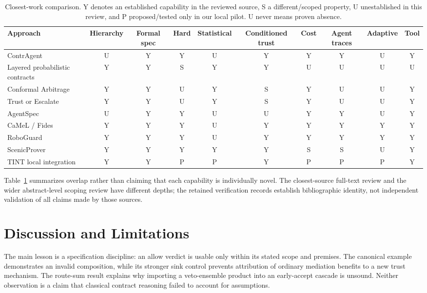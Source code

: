 ﻿\documentclass[lettersize,journal]{IEEEtran}
\begin{document}
\begin{table}[t]
\caption{Closest-work comparison. Y denotes an established capability in the
reviewed source, S a different/scoped property, U unestablished in this review,
and P proposed/tested only in our local pilot. U never means proven absence.}
\label{tab:gap}
\centering\scriptsize
\begin{tabular}{lccccccccc}
\hline
Approach & Hierarchy & Formal spec & Hard & Statistical & Conditioned trust & Cost & Agent traces & Adaptive & Tool\\
\hline
ContrAgent & U & Y & Y & U & Y & Y & Y & U & Y\\
Layered probabilistic contracts & Y & Y & S & Y & Y & U & U & U & U\\
Conformal Arbitrage & Y & Y & U & Y & S & Y & U & U & Y\\
Trust or Escalate & Y & Y & U & Y & S & Y & U & U & Y\\
AgentSpec & U & Y & Y & U & U & Y & Y & U & Y\\
CaMeL / Fides & Y & Y & Y & U & Y & Y & Y & Y & Y\\
RoboGuard & Y & Y & Y & U & Y & Y & Y & Y & Y\\
ScenicProver & Y & Y & Y & Y & Y & S & S & U & Y\\
TINT local integration & Y & Y & P & P & Y & P & P & P & Y\\
\hline
\end{tabular}
\end{table}

Table~\ref{tab:gap} summarizes overlap rather than claiming that each
capability is individually novel. The closest-source full-text review and the
wider abstract-level scoping review have different depths; the retained
verification records establish bibliographic identity, not independent
validation of all claims made by those sources.

\section{Discussion and Limitations}
The main lesson is a specification discipline: an allow verdict is usable
only within its stated scope and premises. The canonical example demonstrates
an invalid composition, while its stronger sink control prevents attribution
of ordinary mediation benefits to a new trust mechanism. The route-sum result
explains why importing a veto-ensemble product into an early-accept cascade is
unsound. Neither observation is a claim that classical contract reasoning
failed to account for assumptions.
\end{document}
